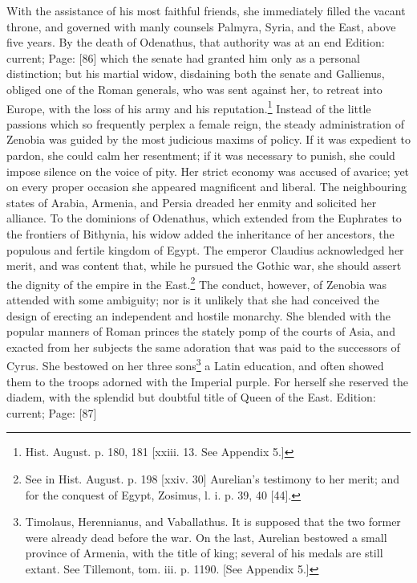 With the assistance of his most faithful friends, she immediately filled the vacant throne, and governed with manly counsels Palmyra, Syria, and the East, above five years. By the death of Odenathus, that authority was at an end Edition: current; Page: [86] which the senate had granted him only as a personal distinction; but his martial widow, disdaining both the senate and Gallienus, obliged one of the Roman generals, who was sent against her, to retreat into Europe, with the loss of his army and his reputation.\footnote{Hist. August. p. 180, 181 [xxiii. 13. See Appendix 5.]} Instead of the little passions which so frequently perplex a female reign, the steady administration of Zenobia was guided by the most judicious maxims of policy. If it was expedient to pardon, she could calm her resentment; if it was necessary to punish, she could impose silence on the voice of pity. Her strict economy was accused of avarice; yet on every proper occasion she appeared magnificent and liberal. The neighbouring states of Arabia, Armenia, and Persia dreaded her enmity and solicited her alliance. To the dominions of Odenathus, which extended from the Euphrates to the frontiers of Bithynia, his widow added the inheritance of her ancestors, the populous and fertile kingdom of Egypt. The emperor Claudius acknowledged her merit, and was content that, while he pursued the Gothic war, she should assert the dignity of the empire in the East.\footnote{See in Hist. August. p. 198 [xxiv. 30] Aurelian\texthebrew{}’s testimony to her merit; and for the conquest of Egypt, Zosimus, l. i. p. 39, 40 [44].} The conduct, however, of Zenobia was attended with some ambiguity; nor is it unlikely that she had conceived the design of erecting an independent and hostile monarchy. She blended with the popular manners of Roman princes the stately pomp of the courts of Asia, and exacted from her subjects the same adoration that was paid to the successors of Cyrus. She bestowed on her three sons\footnote{Timolaus, Herennianus, and Vaballathus. It is supposed that the two former were already dead before the war. On the last, Aurelian bestowed a small province of Armenia, with the title of king; several of his medals are still extant. See Tillemont, tom. iii. p. 1190. [See Appendix 5.]} a Latin education, and often showed them to the troops adorned with the Imperial purple. For herself she reserved the diadem, with the splendid but doubtful title of Queen of the East.
Edition: current; Page: [87]

